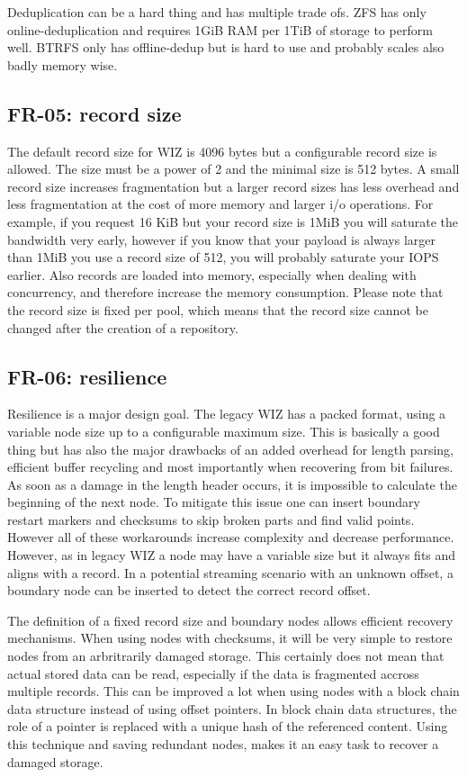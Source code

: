 \documentclass[9pt,pagesize,DIV12,normalheadings,BCOR5mm,headexclude,footexclude]{scrbook}
\newcommand{\wiz}{WIZ }
\begin{document}
Deduplication can be a hard thing and has multiple trade ofs. 
ZFS has only online-deduplication and requires 1GiB RAM per 1TiB of 
storage to perform well. BTRFS only has offline-dedup but is hard
to use and probably scales also badly memory wise.

\subsection{FR-05: record size}
The default record size for \wiz is 4096 bytes but a configurable record size is 
allowed. The size must be a power of 2 and the minimal size is 512 bytes. 
A small record size increases fragmentation but a larger record sizes 
has less overhead and less 
fragmentation at the cost of more memory and larger i/o operations. 
For example, if you request 16 KiB but your record size is 1MiB you will
saturate the bandwidth very early, however if you know that your payload
is always larger than 1MiB you use a record size of 512, you will probably 
saturate your IOPS earlier. Also records are loaded into memory, 
especially when dealing with concurrency, and therefore increase the memory
consumption.
Please note that the record size is fixed per pool, which means
that the record size cannot be changed after the creation of a repository.

\subsection{FR-06: resilience}
Resilience is a major design goal. The legacy \wiz has a packed format, using
a variable node size up to a configurable maximum size. This is basically a
good thing but has also the major drawbacks of an added overhead for length 
parsing, efficient buffer recycling and most importantly when recovering
from bit failures. As soon as a damage in the length header occurs, 
it is impossible to calculate the beginning of the next node. To mitigate this
issue one can insert boundary restart markers and checksums to skip 
broken parts and find valid points. However all of these workarounds increase
complexity and decrease performance. 
However, as in legacy \wiz a node may have a variable size but it always fits 
and aligns with a record. In a potential streaming scenario with an unknown 
offset, a boundary node can be inserted to detect the correct record offset.

The definition of a fixed record size and boundary nodes allows efficient
recovery mechanisms. When using nodes with checksums, it will be very simple
to restore nodes from an arbritrarily damaged storage. This certainly does
not mean that actual stored data can be read, especially if the data is 
fragmented accross multiple records. This can be improved a lot when using
nodes with a block chain data structure instead of using offset pointers.
In block chain data structures, the role of a pointer is replaced with 
a unique hash of the referenced content. Using this technique and saving
redundant nodes, makes it an easy task to recover 
a damaged storage.
\end{document}
